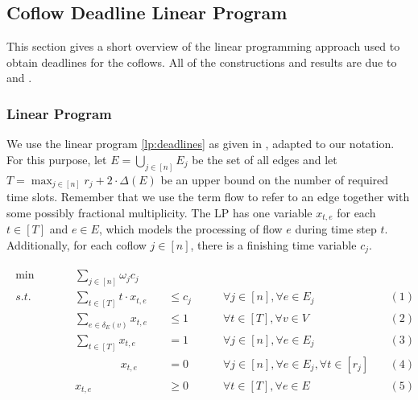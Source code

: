 \documentclass[11pt]{article}
\begin{document}
\subsection{Coflow Deadline Linear Program}\label{sec:app:coflowdeadline}
This section gives a short overview of the linear programming approach used to obtain deadlines for the coflows. All of the constructions and results are due to \cite{fukunaga22} and \cite{im19}.
\subsubsection*{Linear Program}
We use the linear program \ref{lp:deadlines} as given in \cite{fukunaga22}, adapted to our notation. For this purpose, let $E = \bigcup_{j \in [n]}E_j$ be the set of all edges and let $T = \max_{j \in [n]}r_j + 2\cdot \Delta(E)$ be an upper bound on the number of required time slots. Remember that we use the term flow to refer to an edge together with some possibly fractional multiplicity. The LP has one variable $x_{t,e}$ for each $t \in [T]$ and $e \in E$, which models the processing of flow $e$ during time step $t$. Additionally, for each coflow $j \in [n]$, there is a finishing time variable $c_j$.

\begin{gather*}\label{lp:deadlines}\tag{LP D}
\begin{aligned}
\min\qquad &&\sum_{j \in [n]} \omega_jc_j  &~&&~\\
s.t.\qquad &&\sum_{t \in [T]}t\cdot x_{t,e} &\quad\le c_j \qquad&\forall j \in [n], \forall e \in E_j&& (1)\\
~&&\sum_{e \in \delta_E(v)}x_{t,e} &\quad\le 1\qquad &\forall t \in [T],\forall v \in V && (2)\\
~&&\sum_{t \in [T]} x_{t,e} &\quad= 1\qquad &\forall j \in [n], \forall e \in E_j && (3)\\
~&&\phantom{\sum_{x \in [T]}}x_{t,e} &\quad =  0\qquad &\forall j \in [n], \forall e \in E_j, \forall t \in [r_j] && (4)\\
~&&x_{t,e} &\quad\ge 0\qquad &\forall t \in [T], \forall e \in E && (5)
\end{aligned}
\end{gather*}
\vspace{0.2cm}\\
\end{document}
